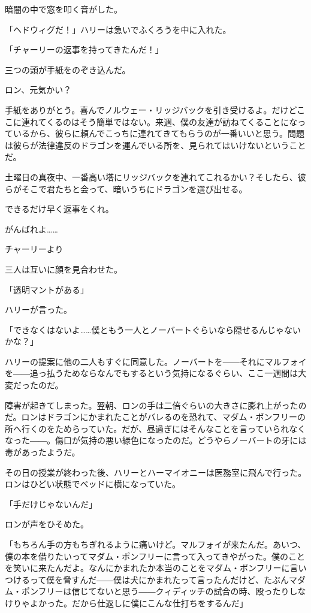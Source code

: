 \documentclass[10pt,a4paper]{article}
\begin{document}
\begin{CJK}{UTF8}{min}
暗闇の中で窓を叩く音がした。

「ヘドウィグだ！」ハリーは急いでふくろうを中に入れた。

「チャーリーの返事を持ってきたんだ！」

三つの頭が手紙をのぞき込んだ。



ロン、元気かい？

手紙をありがとう。喜んでノルウェー・リッジバックを引き受けるよ。だけどここに連れてくるのはそう簡単ではない。来週、僕の友達が訪ねてくることになっているから、彼らに頼んでこっちに連れてきてもらうのが一番いいと思う。問題は彼らが法律違反のドラゴンを運んでいる所を、見られてはいけないということだ。

土曜日の真夜中、一番高い塔にリッジバックを連れてこれるかい？そしたら、彼らがそこで君たちと会って、暗いうちにドラゴンを選び出せる。

できるだけ早く返事をくれ。

がんばれよ……

チャーリーより



三人は互いに顔を見合わせた。

「透明マントがある」

ハリーが言った。

「できなくはないよ……僕ともう一人とノーバートぐらいなら隠せるんじゃないかな？」

ハリーの提案に他の二人もすぐに同意した。ノーバートを――それにマルフォイを――追っ払うためならなんでもするという気持になるぐらい、ここ一週間は大変だったのだ。



障害が起きてしまった。翌朝、ロンの手は二倍ぐらいの大きさに膨れ上がったのだ。ロンはドラゴンにかまれたことがバレるのを恐れて、マダム・ポンフリーの所へ行くのをためらっていた。だが、昼過ぎにはそんなことを言っていられなくなった――。傷口が気持の悪い緑色になったのだ。どうやらノーバートの牙には毒があったようだ。

その日の授業が終わった後、ハリーとハーマイオニーは医務室に飛んで行った。ロンはひどい状態でベッドに横になっていた。

「手だけじゃないんだ」

ロンが声をひそめた。

「もちろん手の方もちぎれるように痛いけど。マルフォイが来たんだ。あいつ、僕の本を借りたいってマダム・ポンフリーに言って入ってきやがった。僕のことを笑いに来たんだよ。なんにかまれたか本当のことをマダム・ポンフリーに言いつけるって僕を脅すんだ――僕は犬にかまれたって言ったんだけど、たぶんマダム・ポンフリーは信じてないと思う――クィディッチの試合の時、殴ったりしなけりゃよかった。だから仕返しに僕にこんな仕打ちをするんだ」


\end{CJK}
\end{document}
